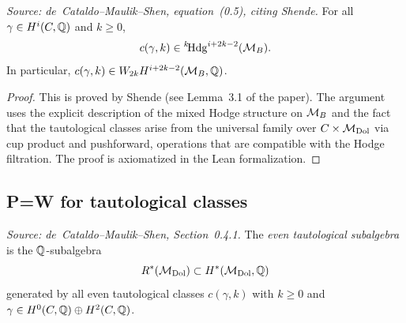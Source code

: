 \begin{lemma}
  \label{lem:taut_weight}
  \textit{Source: de~Cataldo--Maulik--Shen, equation~(0.5), citing Shende.}
  For all \(\gamma \in H^i(C,\mathbb{Q})\) and \(k \geq 0\),
  \[
    c(\gamma,k) \in {}^{k}\!\mathrm{Hdg}^{i+2k-2}(\mathcal{M}_B).
  \]
  In particular, \(c(\gamma,k) \in W_{2k} H^{i+2k-2}(\mathcal{M}_B,\mathbb{Q})\).
\end{lemma}

\begin{proof}
  \uses{}
  This is proved by Shende (see Lemma~3.1 of the paper).  The argument uses
  the explicit description of the mixed Hodge structure on \(\mathcal{M}_B\) and the
  fact that the tautological classes arise from the universal family over
  \(C \times \mathcal{M}_{\mathrm{Dol}}\) via cup product and pushforward, operations that are
  compatible with the Hodge filtration.  The proof is axiomatized in the
  Lean formalization.
\end{proof}

\subsection{P=W for tautological classes}

\begin{definition}
  \label{def:EvenTautSubalgebra}
  \textit{Source: de~Cataldo--Maulik--Shen, Section~0.4.1.}
  The \emph{even tautological subalgebra} is the \(\mathbb{Q}\)-subalgebra
  \[
    R^*(\mathcal{M}_{\mathrm{Dol}}) \subset H^*(\mathcal{M}_{\mathrm{Dol}}, \mathbb{Q})
  \]
  generated by all even tautological classes
  \(c(\gamma,k)\) with \(k \geq 0\) and
  \(\gamma \in H^0(C,\mathbb{Q}) \oplus H^2(C,\mathbb{Q})\).
\end{definition}


